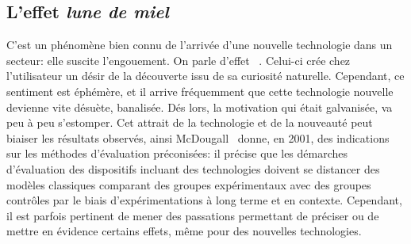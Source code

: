     \subsection{L'effet \textit{lune de miel}}
        C'est un phénomène bien connu de l'arrivée d'une nouvelle technologie dans un secteur: elle suscite l'engouement.
        On parle d'effet ~. Celui-ci crée chez l'utilisateur un désir de la découverte issu de sa curiosité naturelle. Cependant, ce sentiment est éphémère, et il arrive fréquemment que cette technologie nouvelle devienne vite désuète, banalisée. Dés lors, la motivation qui était galvanisée, va peu à peu s'estomper.
        Cet attrait de la technologie et de la nouveauté peut biaiser les résultats observés, ainsi McDougall~ donne, en 2001, des indications sur les méthodes d’évaluation préconisées: il précise que les démarches d’évaluation des dispositifs incluant des technologies doivent se distancer des modèles classiques comparant des groupes expérimentaux avec des groupes contrôles par le biais d'expérimentations à long terme et en contexte. Cependant, il est parfois pertinent de mener des passations  permettant de préciser ou de mettre en évidence certains effets, même pour des nouvelles technologies.